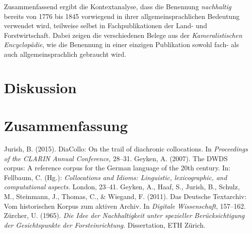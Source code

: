 \documentclass[
    german,
    a4paper,%
    12pt,%
    oneside,%
    toc=bibliography,
    final,
]{scrartcl}
\begin{document}
Zusammenfassend ergibt die Kontextanalyse, dass die Benennung \textit{nachhaltig} bereits von 1776 bis 1845 vorwiegend in ihrer allgemeinsprachlichen Bedeutung verwendet wird, teilweise selbst in Fachpublikationen der Land- und Forstwirtschaft. Dabei zeigen die verschiedenen Belege aus der \textit{Kameralistischen Encyclopädie}, wie die Benennung in einer einzigen Publikation sowohl fach- als auch allgemeinsprachlich gebraucht wird.


\section{Diskussion}
\label{sec:diskussion}


\section{Zusammenfassung}
\label{sec:zusammenfassung}



\newpage
\begin{thebibliography}{9}


 Jurish, B. (2015). DiaCollo: On the trail of diachronic collocations. In \textit{Proceedings of the CLARIN Annual Conference}, 28–31.
 Geyken, A. (2007). The DWDS corpus: A reference corpus for the German language of the 20th century. In: Fellbaum, C. (Hg.): \textit{Collocations and Idioms: Linguistic, lexicographic, and computational aspects.} London, 23–41.
 Geyken, A., Haaf, S., Jurish, B., Schulz, M., Steinmann, J., Thomas, C., \& Wiegand, F. (2011). Das Deutsche Textarchiv: Vom historischen Korpus zum aktiven Archiv. In \textit{Digitale Wissenschaft}, 157–162.
 Zürcher, U. (1965). \textit{Die Idee der Nachhaltigkeit unter spezieller Berücksichtigung der Gesichtspunkte der Forsteinrichtung.} Dissertation, ETH Zürich.

\end{thebibliography}
\end{document}
